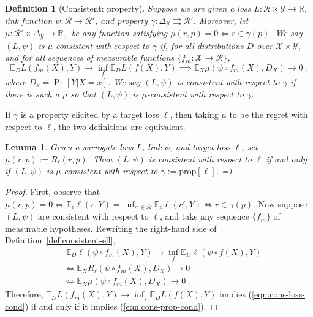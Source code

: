 \documentclass{article}
\newcommand{\Comments}{1}
\newcommand{\mytodo}[2]{\ifnum\Comments=1%
	\todo[linecolor=#1!80!black,backgroundcolor=#1,bordercolor=#1!80!black]{#2}\fi}
\newcommand{\btw}[1]{\mytodo{gray!10!white}{\textcolor{gray}{BTW: #1}}}%
\newcommand{\reals}{\mathbb{R}}
\newcommand{\simplex}{\Delta_\Y}
\newcommand{\prop}[1]{\mathrm{prop}[#1]}
\newcommand{\propdis}{\mu}
\newcommand{\E}{\mathbb{E}}
\newcommand{\R}{\mathcal{R}}
\newcommand{\X}{\mathcal{X}}
\newcommand{\Y}{\mathcal{Y}}
\newcommand{\exploss}[3]{\E_{#3} #1(#2,Y)}
\newcommand{\toto}{\rightrightarrows}
\newtheorem{lemma}{Lemma}
\newtheorem{definition}{Definition}
\begin{document}
\begin{definition}[Consistent: property]\label{def:consistent-prop}
	Suppose we are given a loss $L : \R \times \Y \to \reals$, link function $\psi: \R \to \R'$, and property $\gamma:\simplex \toto \R'$.
	Moreover, let $\propdis : \R' \times \simplex \to \reals_+$ be any function satisfying $\propdis(r,p) = 0 \iff r \in \gamma(p)$.
	We say $(L, \psi)$ is \emph{$\mu$-consistent with respect to} $\gamma$ if, for all distributions $D$ over $\X \times \Y$, and for all sequences of measurable functions $\{f_m: \X \to \R\}$, 
	\begin{equation}
    \E_{D} L(f_m(X), Y) \to \inf_f \E_{D} L( f(X), Y) \implies \E_X \propdis(\psi \circ f_m(X), D_X) \to 0~,
  \end{equation}
  where $D_x = \Pr[Y|X=x]$.
	We say $(L,\psi)$ is consistent with respect to $\gamma$ if there is such a $\propdis$ so that $(L,\psi)$ is $\propdis$-consistent with respect to $\gamma$.
\end{definition}


If $\gamma$ is a property elicited by a target loss $\ell$, then taking $\propdis$ to be the regret with respect to $\ell$, the two definitions are equivalent. %
\begin{lemma}\label{lem:consistent-loss-implies-prop}
	Given a surrogate loss $L$, link $\psi$, and target loss $\ell$, set
  $\mu(r,p) := R_\ell(r,p)$.
  Then
	$(L, \psi)$ is consistent with respect to $\ell$ if and only if $(L,\psi)$ is $\propdis$-consistent with respect to $\gamma := \prop{\ell}$.
  \btw{Note: don't actually $\gamma$ nonempty here.}
\end{lemma}
\begin{proof}
	First, observe that $\propdis(r,p) = 0 \iff \exploss{\ell}{r}{p} = \inf_{r' \in \R} \exploss{\ell}{r'}{p} \iff r \in \gamma(p)$.
	Now suppose $(L, \psi)$ are consistent with respect to $\ell$, and take any sequence $\{f_m\}$ of measurable hypotheses.
  Rewriting the right-hand side of Definition~\ref{def:consistent-ell},
        \begin{align}
	  &\; \E_D \ell(\psi \circ f_m(X), Y)\to \inf_f \E_D \ell(\psi \circ f(X), Y)   \label{eqn:cons-loss-cond} \\
	  &\iff \E_X R_\ell(\psi \circ f_m(X), D_X) \to 0                               \nonumber  \\
	  &\iff \E_X \propdis(\psi \circ f_m(X), D_X) \to 0~.~                          \label{eqn:cons-prop-cond}
	\end{align}
        Therefore, $\mathbb{E}_D L(f_m(X),Y) \to \inf_f \mathbb{E}_D L(f(X),Y)$ implies (\ref{eqn:cons-loss-cond}) if and only if it implies (\ref{eqn:cons-prop-cond}).
\end{proof}
\end{document}
